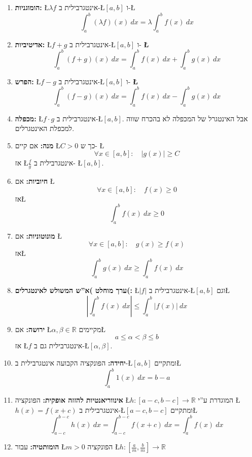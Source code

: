 \documentclass[english,hebrew]{article}
\theoremstyle{remark}
\theoremstyle{definition}
\theoremstyle{plain}
\theoremstyle{remark}
\theoremstyle{plain}
\theoremstyle{plain}
\theoremstyle{definition}
\theoremstyle{plain}
\begin{document}
\begin{enumerate}
\item \textbf{הומוגניות: }\L{$\lambda f$} אינטגרבילית ב-\L{$\left[a,b\right]$}
ו-\L{%
\[
\int_{a}^{b}\left(\lambda f\right)\left(x\right)\ dx=\lambda\int_{a}^{b}f\left(x\right)\ dx
\]
}%
\item \textbf{אדיטיביות: }\L{$f+g$} אינטגרבילית ב-\L{$\left[a,b\right]$}
ו-\textbf{ \L{%
\[
\int_{a}^{b}\left(f+g\right)\left(x\right)\ dx=\int_{a}^{b}f\left(x\right)\ dx+\int_{a}^{b}g\left(x\right)\ dx
\]
}%
}
\item \textbf{הפרש: }\L{$f-g$} אינטגרבילית ב-\L{$\left[a,b\right]$} ו-\textbf{
\L{%
\[
\int_{a}^{b}\left(f-g\right)\left(x\right)\ dx=\int_{a}^{b}f\left(x\right)\ dx-\int_{a}^{b}g\left(x\right)\ dx
\]
}%
}
\item \textbf{מכפלה: }\L{$f\cdot g$} אינטגרבילית ב-\L{$\left[a,b\right]$}.
אבל האינטגרל של המכפלה לא בהכרח שווה למכפלת האינטגרלים.
\item \textbf{מנה: }אם קיים \L{$C>0$} כך ש- \L{%
\[
\forall x\in\left[a,b\right]:\quad\left|g(x)\right|\ge C
\]
}%
אז \L{$\frac{f}{g}$} אינטגרבילית ב- \L{$\left[a,b\right]$}.
\item \textbf{חיוביות: }אם \L{%
\[
\forall x\in\left[a,b\right]:\quad f(x)\ge0
\]
}%
אז\L{%
\[
\int_{a}^{b}f\left(x\right)\ dx\ge0
\]
}%
\item \textbf{מונוטוניות:} אם \L{%
\[
\forall x\in\left[a,b\right]:\quad g(x)\ge f(x)
\]
}%
 אז\L{%
\[
\int_{a}^{b}g\left(x\right)\ dx\ge\int_{a}^{b}f\left(x\right)\ dx
\]
}%
\item \textbf{ערך מוחלט )א\textquotedblright ש המשולש לאינטגרלים(:} \L{$\left|f\right|$}
אינטגרבילית ב-\L{$\left[a,b\right]$} וגם\L{%
\[
\left|\int_{a}^{b}f\left(x\right)\ dx\right|\le\int_{a}^{b}\left|f(x)\right|\ dx
\]
}%
\item \textbf{ירושה: }אם \L{$\alpha,\beta\in\mathbb{R}$} מקיימים\L{%
\[
a\le\alpha<\beta\le b
\]
}%
אז \L{$f$} אינטגרבילית גם ב-\L{$\left[\alpha,\beta\right]$}.
\item \textbf{יחידה:} הפונקציה הקבועה {\endL} אינטגרבילית ב-\L{$\left[a,b\right]$}
ומתקיים\L{%
\[
\int_{a}^{b}1\left(x\right)\ dx=b-a
\]
}%
\item \textbf{אינווריאנטיות להזזה אופקית: }הפונקציה \L{$h:\left[a-c,b-c\right]\rightarrow\mathbb{R}$}
המוגדרת ע\textquotedblright י \L{$h(x)=f(x+c)$} אינטגרבילית ב-\L{$\left[a-c,b-c\right]$}
ומתקיים\L{%
\[
\int_{a-c}^{b-c}h(x)\ dx=\int_{a-c}^{b-c}f\left(x+c\right)\ dx=\int_{a}^{b}f(x)\ dx
\]
}%
\item \textbf{הומותטיה:} עבור \L{$m>0$} הפונקציה \L{$h:\left[\frac{a}{m},\frac{b}{m}\right]\rightarrow\mathbb{R}$}

\end{enumerate}
\end{document}
